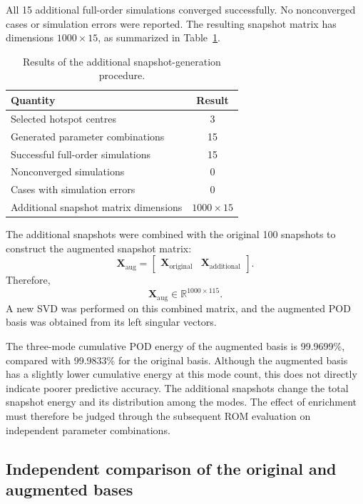 All 15 additional full-order simulations converged
successfully. No nonconverged cases or simulation
errors were reported. The resulting snapshot matrix
has dimensions $1000\times15$, as summarized in
Table~\ref{tab:enrichment_generation_results}.

\begin{table}[htbp]
    \centering
    \caption{Results of the additional snapshot-generation
    procedure.}
    \label{tab:enrichment_generation_results}
    \begin{tabular}{lc}
        \toprule
        \textbf{Quantity} & \textbf{Result} \\
        \midrule
        Selected hotspot centres & 3 \\
        Generated parameter combinations & 15 \\
        Successful full-order simulations & 15 \\
        Nonconverged simulations & 0 \\
        Cases with simulation errors & 0 \\
        Additional snapshot matrix dimensions & $1000\times15$ \\
        \bottomrule
    \end{tabular}
\end{table}

The additional snapshots were combined with the original
100 snapshots to construct the augmented snapshot matrix:
\[
\mathbf{X}_{\mathrm{aug}}
=
\begin{bmatrix}
\mathbf{X}_{\mathrm{original}} &
\mathbf{X}_{\mathrm{additional}}
\end{bmatrix}.
\]
Therefore,
\[
\mathbf{X}_{\mathrm{aug}}
\in\mathbb{R}^{1000\times115}.
\]
A new SVD was performed on this combined matrix, and
the augmented POD basis was obtained from its left
singular vectors.

The three-mode cumulative POD energy of the augmented
basis is 99.9699\%, compared with 99.9833\% for the
original basis. Although the augmented basis has a
slightly lower cumulative energy at this mode count,
this does not directly indicate poorer predictive
accuracy. The additional snapshots change the total
snapshot energy and its distribution among the modes.
The effect of enrichment must therefore be judged
through the subsequent ROM evaluation on independent
parameter combinations.

\subsection{Independent comparison of the original and augmented bases}
\label{subsec:original_augmented_comparison}


